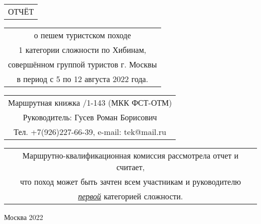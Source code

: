 \begin{titlepage}
    \noindent\parbox{\linewidth}
    {
        \vspace{100pt}
        \Large
        \begin{center} \begin{tabular}{c}
            ОТЧЁТ\\
        \end{tabular}  \end{center}
    }
    \noindent\parbox{\linewidth}
    {
        \vspace{10pt}
        \large
        \begin{center} \begin{tabular}{c}
            о пешем туристском походе\\
            1 категории сложности по Хибинам,\\
            совершённом группой туристов г. Москвы\\
            в период с 5 по 12 августа 2022 года.
        \end{tabular}  \end{center}
    }
    \noindent\parbox{\linewidth}
    {
        \vspace{20pt}
        \large
        \begin{center} \begin{tabular}{c}
            Маршрутная книжка \textnumero1/1-143 (МКК ФСТ-ОТМ)\\
            Руководитель: Гусев Роман Борисович\\
            Тел. +7(926)227-66-39, \textenglish{e-mail: tek@mail.ru}\\
        \end{tabular}  \end{center}
    }
    \noindent\parbox{\linewidth}
    {
        \vspace{20pt}
        \normalsize
        \begin{center} \begin{tabular}{c}
            Маршрутно-квалификационная комиссия рассмотрела отчет и считает,\\
            что поход может быть зачтен всем участникам и руководителю\\
            \underline{\textit{\large{первой}}} категорией сложности.
        \end{tabular}  \end{center}
    }
    \noindent\parbox{\linewidth}
    {
        \vspace{180pt}
        \large
        \begin{center}
            Москва 2022
        \end{center}
    }
\end{titlepage}

\shipout\null
